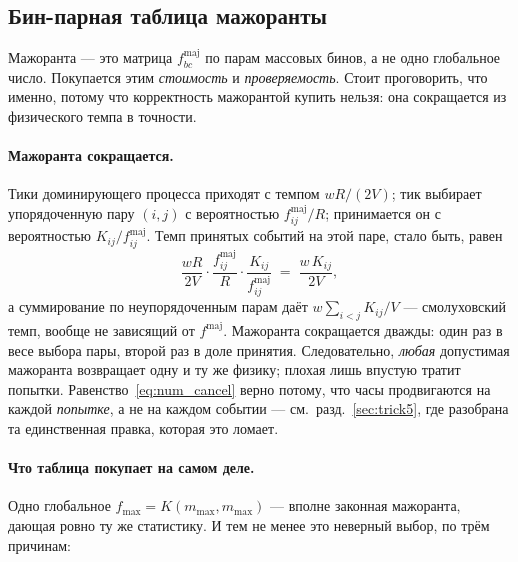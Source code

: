 \documentclass[a4paper,12pt]{article}
\newcommand{\fmaj}{f^{\mathrm{maj}}}
\begin{document}
\subsection{Бин-парная таблица мажоранты}
\label{sec:trick2}

Мажоранта --- это матрица $\fmaj_{bc}$ по парам массовых бинов, а не одно
глобальное число. Покупается этим \emph{стоимость} и \emph{проверяемость}.
Стоит проговорить, что именно, потому что корректность мажорантой купить
нельзя: она сокращается из физического темпа в точности.

\paragraph{Мажоранта сокращается.}
Тики доминирующего процесса приходят с темпом $wR/(2V)$; тик выбирает
упорядоченную пару $(i,j)$ с вероятностью $\fmaj_{ij}/R$; принимается он с
вероятностью $K_{ij}/\fmaj_{ij}$. Темп принятых событий на этой паре, стало
быть, равен
\begin{equation}
  \frac{wR}{2V}\cdot\frac{\fmaj_{ij}}{R}\cdot\frac{K_{ij}}{\fmaj_{ij}}
  \;=\; \frac{w\,K_{ij}}{2V},
  \label{eq:num_cancel}
\end{equation}
а суммирование по неупорядоченным парам даёт $w\sum_{i<j}K_{ij}/V$ ---
смолуховский темп, вообще не зависящий от $\fmaj$. Мажоранта сокращается
дважды: один раз в весе выбора пары, второй раз в доле принятия.
Следовательно, \emph{любая} допустимая мажоранта возвращает одну и ту же
физику; плохая лишь впустую тратит попытки. Равенство~\eqref{eq:num_cancel}
верно потому, что часы продвигаются на каждой \emph{попытке}, а не на каждом
событии --- см.\ разд.~\ref{sec:trick5}, где разобрана та единственная
правка, которая это ломает.

\paragraph{Что таблица покупает на самом деле.}
Одно глобальное $f_{\max} = K(m_{\max},m_{\max})$ --- вполне законная
мажоранта, дающая ровно ту же статистику. И тем не менее это неверный выбор,
по трём причинам:
\end{document}
